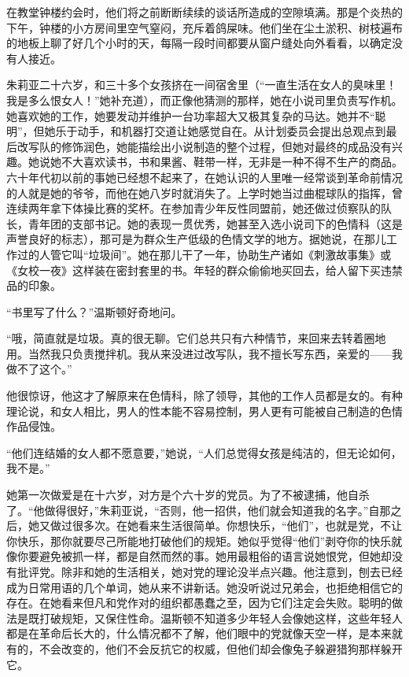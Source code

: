 在教堂钟楼约会时，他们将之前断断续续的谈话所造成的空隙填满。那是个炎热的下午，钟楼的小方房间里空气窒闷，充斥着鸽屎味。他们坐在尘土淤积、树枝遍布的地板上聊了好几个小时的天，每隔一段时间都要从窗户缝处向外看看，以确定没有人接近。

朱莉亚二十六岁，和三十多个女孩挤在一间宿舍里（``一直生活在女人的臭味里！我是多么恨女人！''她补充道），而正像他猜测的那样，她在小说司里负责写作机。她喜欢她的工作，她要发动并维护一台功率超大又极其复杂的马达。她并不``聪明''，但她乐于动手，和机器打交道让她感觉自在。从计划委员会提出总观点到最后改写队的修饰润色，她能描绘出小说制造的整个过程，但她对最终的成品没有兴趣。她说她不大喜欢读书，书和果酱、鞋带一样，无非是一种不得不生产的商品。六十年代初以前的事她已经想不起来了，在她认识的人里唯一经常谈到革命前情况的人就是她的爷爷，而他在她八岁时就消失了。上学时她当过曲棍球队的指挥，曾连续两年拿下体操比赛的奖杯。在参加青少年反性同盟前，她还做过侦察队的队长，青年团的支部书记。她的表现一贯优秀，她甚至入选小说司下的色情科（这是声誉良好的标志），那可是为群众生产低级的色情文学的地方。据她说，在那儿工作过的人管它叫``垃圾间''。她在那儿干了一年，协助生产诸如《刺激故事集》或《女校一夜》这样装在密封套里的书。年轻的群众偷偷地买回去，给人留下买违禁品的印象。

``书里写了什么？''温斯顿好奇地问。

``哦，简直就是垃圾。真的很无聊。它们总共只有六种情节，来回来去转着圈地用。当然我只负责搅拌机。我从来没进过改写队，我不擅长写东西，亲爱的------我做不了这个。''

他很惊讶，他这才了解原来在色情科，除了领导，其他的工作人员都是女的。有种理论说，和女人相比，男人的性本能不容易控制，男人更有可能被自己制造的色情作品侵蚀。

``他们连结婚的女人都不愿意要，''她说，``人们总觉得女孩是纯洁的，但无论如何，我不是。''

她第一次做爱是在十六岁，对方是个六十岁的党员。为了不被逮捕，他自杀了。``他做得很好，''朱莉亚说，``否则，他一招供，他们就会知道我的名字。''自那之后，她又做过很多次。在她看来生活很简单。你想快乐，``他们''，也就是党，不让你快乐，那你就要尽己所能地打破他们的规矩。她似乎觉得``他们''剥夺你的快乐就像你要避免被抓一样，都是自然而然的事。她用最粗俗的语言说她恨党，但她却没有批评党。除非和她的生活相关，她对党的理论没半点兴趣。他注意到，刨去已经成为日常用语的几个单词，她从来不讲新话。她没听说过兄弟会，也拒绝相信它的存在。在她看来但凡和党作对的组织都愚蠢之至，因为它们注定会失败。聪明的做法是既打破规矩，又保住性命。温斯顿不知道多少年轻人会像她这样，这些年轻人都是在革命后长大的，什么情况都不了解，他们眼中的党就像天空一样，是本来就有的，不会改变的，他们不会反抗它的权威，但他们却会像兔子躲避猎狗那样躲开它。

